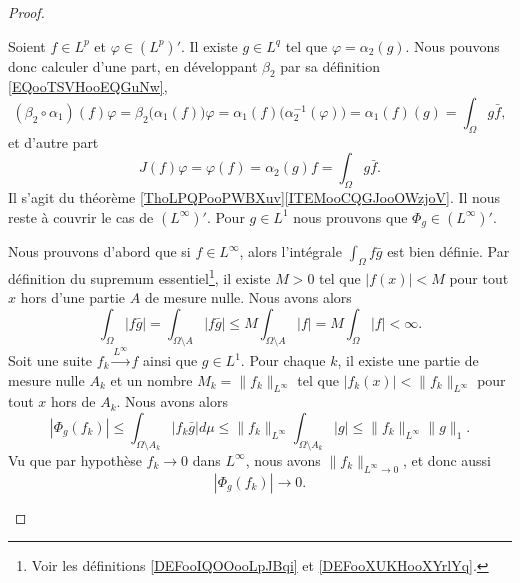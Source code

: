 \begin{proof}
\begin{subproof}
		Soient \( f\in L^p\) et \( \varphi\in (L^p)'\). Il existe \( g\in L^q\) tel que \( \varphi=\alpha_2(g)\). Nous pouvons donc calculer d'une part, en développant \( \beta_2\) par sa définition \eqref{EQooTSVHooEQGuNw},
		\begin{equation}
			(\beta_2\circ \alpha_1)(f)\varphi=\beta_2\big( \alpha_1(f) \big)\varphi
			=\alpha_1(f)\big( \alpha_2^{-1}(\varphi) \big)
			=\alpha_1(f)(g)
			=\int_{\Omega}g\bar f,
		\end{equation}
		et d'autre part
		\begin{equation}
			J(f)\varphi=\varphi(f)
			=\alpha_2(g)f
			=\int_{\Omega}g\bar f.
		\end{equation}
		Il s'agit du théorème \ref{ThoLPQPooPWBXuv}\ref{ITEMooCQGJooOWzjoV}.
		Il nous reste à couvrir le cas de \( (L^{\infty})'\). Pour \( g\in L^1\) nous prouvons que \( \Phi_g\in (L^{\infty})'\).

		\begin{subproof}
			Nous prouvons d'abord que si \( f\in L^{\infty}\), alors l'intégrale \( \int_{\Omega}f\bar g\) est bien définie. Par définition du supremum essentiel\footnote{Voir les définitions \ref{DEFooIQOOooLpJBqi} et \ref{DEFooXUKHooXYrlYq}.}, il existe \( M>0\) tel que \( | f(x) |<M\) pour tout \( x\) hors d'une partie \( A\) de mesure nulle. Nous avons alors
			\begin{equation}
				\int_{\Omega}|f\bar g|=\int_{\Omega\setminus A}| f\bar g |\leq M\int_{\Omega\setminus A}| f |= M\int_{\Omega}| f |<\infty.
			\end{equation}
			Soit une suite \( f_k\stackrel{L^{\infty}}{\longrightarrow}f\) ainsi que \( g\in L^1\). Pour chaque \( k\), il existe une partie de mesure nulle \( A_k\) et un nombre \( M_k=\| f_k \|_{L^{\infty}}\) tel que \( | f_k(x) |<\| f_k \|_{L^{\infty}}\) pour tout \( x\) hors de \( A_k\). Nous avons alors
			\begin{equation}
				| \Phi_g(f_k) |\leq \int_{\Omega\setminus A_k}| f_k\bar g |d\mu\leq \| f_k \|_{L^{\infty}}\int_{\Omega\setminus A_k}| g |\leq \| f_k \|_{L^{\infty}}\| g \|_1.
			\end{equation}
			Vu que par hypothèse \( f_k\to 0\) dans \( L^{\infty}\), nous avons \( \| f_k \|_{L^{\infty}\to 0}\), et donc aussi
			\begin{equation}
				|\Phi_g(f_k)|\to 0.
			\end{equation}
		\end{subproof}
	\end{subproof}
\end{proof}

